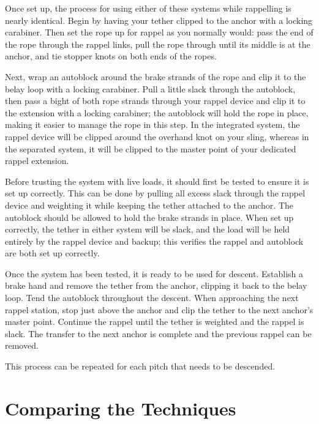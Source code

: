 \documentclass[nonacm,acmtog]{acmart}
\begin{document}
   Once set up, the process for using either of these systems while rappelling
   is nearly identical.  Begin by having your tether clipped to the anchor with
   a locking carabiner.  Then set the rope up for rappel as you normally would:
   pass the end of the rope through the rappel links, pull the rope through
   until its middle is at the anchor, and tie stopper knots on both ends of the
   ropes.

   Next, wrap an autoblock around the brake strands of the rope and clip it to
   the belay loop with a locking carabiner.  Pull a little slack through the
   autoblock, then pass a bight of both rope strands through your rappel device
   and clip it to the extension with a locking carabiner; the autoblock will
   hold the rope in place, making it easier to manage the rope in this step.
   In the integrated system, the rappel device will be clipped around the
   overhand knot on your sling, whereas in the separated system, it will be
   clipped to the master point of your dedicated rappel extension.

   Before trusting the system with live loads, it should first be tested to
   ensure it is set up correctly.  This can be done by pulling all excess slack
   through the rappel device and weighting it while keeping the tether attached
   to the anchor.  The autoblock should be allowed to hold the brake strands in
   place.  When set up correctly, the tether in either system will be slack,
   and the load will be held entirely by the rappel device and backup; this
   verifies the rappel and autoblock are both set up correctly.

   Once the system has been tested, it is ready to be used for descent.
   Establish a brake hand and remove the tether from the anchor, clipping it
   back to the belay loop.  Tend the autoblock throughout the descent.  When
   approaching the next rappel station, stop just above the anchor and clip
   the tether to the next anchor’s master point.  Continue the rappel until the
   tether is weighted and the rappel is slack.  The transfer to the next anchor
   is complete and the previous rappel can be removed.

   This process can be repeated for each pitch that needs to be descended.


\section{Comparing the Techniques}
\label{sec:compare}
\end{document}
